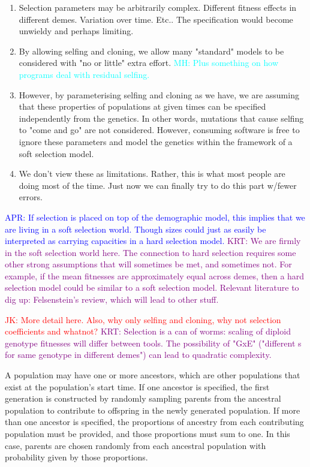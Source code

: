 \documentclass[11pt]{article}
\newcommand{\aprcomment}[1]{{\textcolor{blue}{APR: #1}}}
\newcommand{\jkcomment}[1]{{\textcolor{red}{JK: #1}}}
\newcommand{\krtcomment}[1]{{\textcolor{purple}{KRT: #1}}}
\newcommand{\mhcomment}[1]{{\textcolor{cyan}{MH: #1}}}
\begin{document}
\begin{enumerate}
    \item Selection parameters may be arbitrarily complex.  Different fitness effects in different demes.
          Variation over time.  Etc..
          The specification would become unwieldy and perhaps limiting.
    \item By allowing selfing and cloning, we allow many "standard" models to be considered with "no or little"
          extra effort. \mhcomment{Plus something on how programs deal with residual selfing.}
    \item However, by parameterising selfing and cloning as we have, we are assuming that these properties of
          populations at given times can be specified independently from the genetics.
          In other words, mutations that cause selfing to "come and go" are not considered.
          However, consuming software is free to ignore these parameters and model the genetics within
          the framework of a soft selection model.
    \item We don't view these as limitations. Rather, this is what most people are doing most of the time.
          Just now we can finally try to do this part w/fewer errors.
\end{enumerate}


\aprcomment{If selection is placed on top of the demographic model, this implies
that we are living in a soft selection world. Though sizes could just as easily
be interpreted as carrying capacities in a hard selection model.}
\krtcomment{We are firmly in the soft selection world here.  The connection to hard selection
requires some other strong assumptions that will sometimes be met, and sometimes not.
For example, if the mean fitnesses are approximately equal across demes, then a hard selection
model could be similar to a soft selection model.  Relevant literature to dig up: Felsenstein's review,
which will lead to other stuff.}

\jkcomment{More detail here. Also, why only selfing and cloning, why not selection
coefficients and whatnot?}
\krtcomment{Selection is a can of worms: scaling of diploid genotype fitnesses will differ between tools.
The possibility of "GxE" ("different s for same genotype in different demes") can lead to quadratic complexity.}

A population may have one
or more ancestors, which are other populations that exist at the population's
start time. If one ancestor is specified, the first generation is constructed
by randomly sampling parents from the ancestral population to contribute to
offspring in the newly generated population. If more than one ancestor is
specified, the proportions of ancestry from each contributing population must
be provided, and those proportions must sum to one. In this case, parents are
chosen randomly from each ancestral population with probability given by those
proportions.
\end{document}
